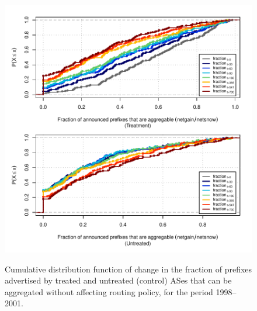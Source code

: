 \begin{figure}[H]
\begin{centering}
\begin{singlespace}
    \includegraphics[width=6in]{figures/behavior-frac_deagg-1998_2001-corr.pdf}
    \vspace{-2em}\\
    \caption{Cumulative distribution function of change in the fraction of prefixes advertised by treated and untreated (control) ASes that can be aggregated without affecting routing policy, for the period 1998--2001.}
\end{singlespace}
\end{centering}
\end{figure}
